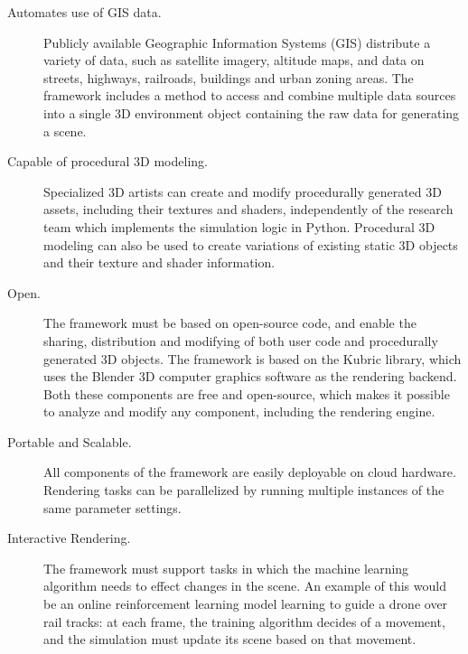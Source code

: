 \begin{description}
    \item[Automates use of GIS data.] Publicly available Geographic Information Systems (GIS) distribute a variety of data, such as satellite imagery, altitude maps, and data on streets, highways, railroads, buildings and urban zoning areas. The framework includes a method to access and combine multiple data sources into a single 3D environment object containing the raw data for generating a scene.
    \item[Capable of procedural 3D modeling.] Specialized 3D artists can create and modify procedurally generated 3D assets, including their textures and shaders, independently of the research team which implements the simulation logic in Python. Procedural 3D modeling can also be used to create variations of existing static 3D objects and their texture and shader information.
    \item[Open.]  The framework must be based on open-source code, and enable the sharing, distribution and modifying of both user code and procedurally generated 3D objects. The framework is based on the Kubric library, which uses the Blender 3D computer graphics software as  the rendering backend. Both these components are free and open-source, which makes it possible to analyze and modify any component, including the rendering engine.
    \item[Portable and Scalable.]  All components of the framework are easily deployable on cloud hardware. Rendering tasks can be parallelized by running multiple instances of the same parameter settings.
    \item[Interactive Rendering.] The framework must support tasks in which the machine learning algorithm needs to effect changes in the scene. An example of this would be an online reinforcement learning model learning to guide a drone over rail tracks: at each frame, the training algorithm decides of a movement, and the simulation must update its scene based on that movement.
\end{description}


